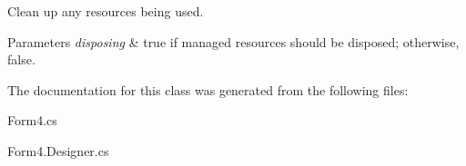 Clean up any resources being used. 


\begin{DoxyParams}{Parameters}
{\em disposing} & true if managed resources should be disposed; otherwise, false.\\
\hline
\end{DoxyParams}


The documentation for this class was generated from the following files\+:\begin{DoxyCompactItemize}
\item 
Form4.\+cs\item 
Form4.\+Designer.\+cs\end{DoxyCompactItemize}
